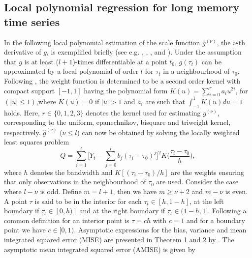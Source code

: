 \documentclass[12pt]{article}
\begin{document}

\subsection{Local polynomial regression for long memory time series}
In the following local polynomial estimation of the scale function $g^{(\nu)}$, the $\nu$-th derivative of $g$, is exemplified briefly (see e.g. \cite{beran2002iterative}, \cite{beran2002local}, \cite{beran2002semifar}, and \cite{beran2013limit}). Under the assumption that $g$ is at least ($l+1$)-times differentiable at a point $t_0$, $g(\tau_t)$ can be approximated by a local polynomial of order $l$ for $\tau_t$ in a neighbourhood of $\tau_0$. Following \citet{gasser1979kernel}, the weight function is determined to be a second order kernel with compact support $[-1,1]$ having the polynomial form $K(u)=\sum_{i=0}^{r}a_i u^{2i}$, for $(|u|\leq1)$,where $K(u)=0$ if $|u|>1$ and $a_i$ are such that $\int_{-1}^{1}K(u)du=1$ holds.  Here, $r \in \{0,1,2,3\}$ denotes the kernel used for estimating $g^{(\nu)}$, corresponding to the uniform, epanechnikov, bisquare and triweight kernel, respectively.
$\hat{g}^{(\nu)}$ ($\nu\leq l$) can now be obtained by solving the locally weighted least squares problem
\begin{equation}
\label{LP}
Q=\sum_{i=1}^{t}\Bigg[Y_t-\sum_{j=0}^{l}b_j(\tau_i-\tau_0)^j\Bigg]^2 K\Big(\frac{\tau_i-\tau_0}{h}\Big),	
\end{equation}
where $h$ denotes the bandwidth and $K[(\tau_i-\tau_0)/h]$ are the weights ensuring that only observations in the neighbourhood of $\tau_0$ are used. Consider the case where $l-\nu$ is odd. Define $m=l+1$, then we have $m \geq \nu + 2$ and $m-\nu$ is even. A point $\tau$ is said to be in the interior for each $\tau_t\in [h,1-h]$, at the left boundary if $\tau_t\in [0,h)]$ and at the right boundary if $\tau_t\in (1-h,1]$. Following \citet{beran2002local} a common definition for an interior point is $\tau=ch$ with $c=1$ and for a boundary point we have $c \in [0,1)$.   
Asymptotic expressions for the bias, variance and mean integrated squared error (MISE) are presented in Theorem 1 and 2 by \citet{beran2002local}. The asymptotic mean integrated squared error (AMISE) is given by
\end{document}
